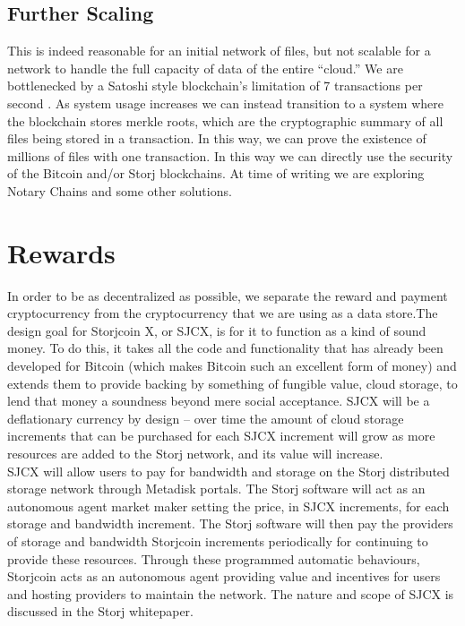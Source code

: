 \documentclass[a4paper,10pt]{article}
\begin{document}
\subsection{Further Scaling}

This is indeed reasonable for an initial network of files, but not scalable for a network to handle the full capacity of data of the entire “cloud.” We are bottlenecked by a Satoshi style blockchain’s limitation of 7 transactions per second \cite{14}. As system usage increases we can instead transition to a system where the blockchain stores merkle roots, which are the cryptographic summary of all files being stored in a transaction. In this way, we can prove the existence of millions of files with one transaction. In this way we can directly use the security of the Bitcoin and/or Storj blockchains. At time of writing we are exploring Notary Chains \cite{15} and some other solutions. 

\section{Rewards}

In order to be as decentralized as possible, we separate the reward and payment cryptocurrency from the cryptocurrency that we are using as a data store.The design goal for Storjcoin X, or SJCX, is for it to function as a kind of sound money.  To do this, it takes all the code and functionality that has already been developed for Bitcoin (which makes Bitcoin such an excellent form of money) and extends them to provide backing by something of fungible value, cloud storage, to lend that money a soundness beyond mere social acceptance. SJCX will be a deflationary currency by design -- over time the amount of cloud storage increments that can be purchased for each SJCX increment will grow as more resources are added to the Storj network, and its value will increase.\\

SJCX will allow users to pay for bandwidth and storage on the Storj distributed storage network through Metadisk portals.  The Storj software will act as an autonomous agent market maker setting the price, in SJCX increments, for each storage and bandwidth increment.  The Storj software will then pay the providers of storage and bandwidth Storjcoin increments periodically for continuing to provide these resources. Through these programmed automatic behaviours, Storjcoin acts as an autonomous agent providing value and incentives for users and hosting providers to maintain the network. The nature and scope of SJCX is discussed in the Storj whitepaper.
\end{document}

